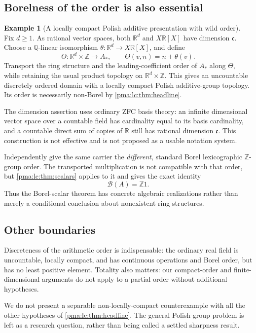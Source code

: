 \documentclass[11pt]{article}
\numberwithin{equation}{section}
\theoremstyle{definition}
\newtheorem{example}[example]{Example}
\theoremstyle{remark}
\newcommand{\Z}{\mathbb Z}
\newcommand{\Q}{\mathbb Q}
\newcommand{\R}{\mathbb R}
\newcommand{\Bsc}{\mathcal B(A)}
\begin{document}
\subsection{Borelness of the order is also essential}
\begin{example}[A locally compact Polish additive presentation with wild order]
\label{pma:lc:ex:wildorder}
Fix $d\ge1$. As rational vector spaces, both $\R^d$ and $X\R[X]$ have
dimension $\mathfrak c$. Choose a $\Q$-linear isomorphism
$\theta:\R^d\to X\R[X]$, and define
\[
 \Theta:\R^d\times\Z\longrightarrow A_*,\qquad
 \Theta(v,n)=n+\theta(v).
\]
Transport the ring structure and the leading-coefficient order of $A_*$
along $\Theta$, while retaining the usual product topology on
$\R^d\times\Z$. This gives an uncountable discretely ordered domain
with a locally compact Polish additive-group topology. Its order is
necessarily non-Borel by \cref{pma:lc:thm:headline}.
\end{example}

The dimension assertion uses ordinary ZFC basis theory: an infinite
dimensional vector space over a countable field has cardinality equal
to its basis cardinality, and a countable direct sum of copies of
$\R$ still has rational dimension $\mathfrak c$. This construction is
not effective and is not proposed as a usable notation system.

Independently give the same carrier the \emph{different}, standard Borel
lexicographic $\Z$-group order. The transported multiplication is not
compatible with that order, but \cref{pma:lc:thm:scalars} applies to it and
gives the exact identity
\[
 \Bsc=\Z1.
\]
Thus the Borel-scalar theorem has concrete algebraic realizations rather
than merely a conditional conclusion about nonexistent ring structures.

\subsection{Other boundaries}
Discreteness of the arithmetic order is indispensable: the ordinary real
field is uncountable, locally compact, and has continuous operations and
Borel order, but has no least positive element. Totality also matters:
our compact-order and finite-dimensional arguments do not apply to a
partial order without additional hypotheses.

We do not present a separable non-locally-compact counterexample with all
the other hypotheses of \cref{pma:lc:thm:headline}. The general Polish-group
problem is left as a research question, rather than being called a
settled sharpness result.
\end{document}
